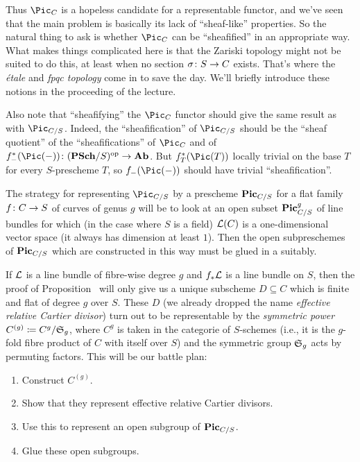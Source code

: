 \documentclass[a4paper,parskip=half,numbers=enddot, DIV=12]{scrreprt}
\begin{document}
Thus $\Pic_C$ is a hopeless candidate for a representable functor, and we've seen that the main problem is basically its lack of ``sheaf-like'' properties. So the natural thing to ask is whether $\Pic_C$ can be ``sheafified'' in an appropriate way. What makes things complicated here is that the Zariski topology might not be suited to do this, at least when no section $\sigma\colon S\morphism C$ exists. That's where the \emph{étale} and \emph{fpqc topology} come in to save the day. We'll briefly introduce these notions in the proceeding of the lecture.

Also note that ``sheafifying'' the $\Pic_C$ functor should give the same result as with $\Pic_{C/S}$. Indeed, the ``sheafification'' of $\Pic_{C/S}$ should be the ``sheaf quotient'' of the ``sheafifications'' of $\Pic_C$ and of $f_-^*(\Pic(-))\colon(\cat{PSch}/S)^\op\morphism\cat{Ab}$. But $f_T^*(\Pic(T))$ locally trivial on the base $T$ for every $S$-prescheme $T$, so $f_-(\Pic(-))$ should have trivial ``sheafification''.

The strategy for representing $\Pic_{C/S}$ by a prescheme $\mathbf{Pic}_{C/S}$ for a flat family $f\colon C\morphism S$ of curves of genus $g$ will be to look at an open subset $\mathbf{Pic}_{C/S}^g$ of line bundles for which (in the case where $S$ is a field) $\mathcal{L}(C)$ is a one-dimensional vector space (it always has dimension at least $1$). Then the open subpreschemes of $\mathbf{Pic}_{C/S}$ which are constructed in this way must be glued in a suitably.

If $\mathcal{L}$ is a line bundle of fibre-wise degree $g$ and $f_*\mathcal{L}$ is a line bundle on $S$, then the proof of Proposition~ will only give us a unique subscheme $D\subseteq C$ which is finite and flat of degree $g$ over $S$. These $D$ (we already dropped the name \emph{effective relative Cartier divisor}) turn out to be representable by the \emph{symmetric power} $C^{(g)}\coloneqq C^{g}/\mathfrak{S}_g$, where $C^{g}$ is taken in the categorie of $S$-schemes (i.e., it is the $g$-fold fibre product of $C$ with itself over $S$) and the symmetric group $\mathfrak{S}_g$ acts by permuting factors. This will be our battle plan:
\begin{enumerate}
	\item Construct $C^{(g)}$.
	\item Show that they represent effective relative Cartier divisors.
	\item Use this to represent an open subgroup of $\mathbf{Pic}_{C/S}$.
	\item Glue these open subgroups.
\end{enumerate}
\end{document}
